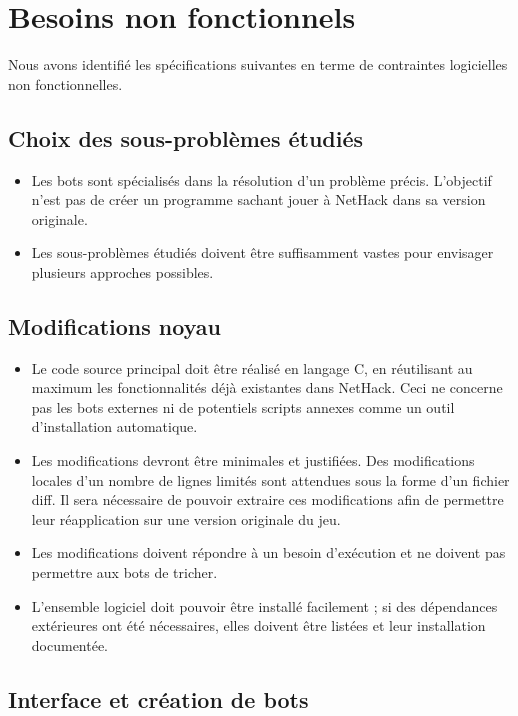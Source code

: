\documentclass[12pt]{article}
\begin{document}
\section{Besoins non fonctionnels}

Nous avons identifié les spécifications suivantes en terme de contraintes logicielles non fonctionnelles.

\subsection{Choix des sous-problèmes étudiés}

\begin{itemize}
	\item Les bots sont spécialisés dans la résolution d'un problème précis.  L'objectif n'est pas de créer un programme sachant jouer à NetHack dans sa version originale.
	\item Les sous-problèmes étudiés doivent être suffisamment vastes pour envisager plusieurs approches possibles.
\end{itemize}

\subsection{Modifications noyau}

\begin{itemize}
	\item Le code source principal doit être réalisé en langage C, en réutilisant au maximum les fonctionnalités déjà existantes dans NetHack. Ceci ne concerne pas les bots externes ni de potentiels scripts annexes comme un outil d'installation automatique.
	\item Les modifications devront être minimales et justifiées. Des modifications locales d'un nombre de lignes limités sont attendues sous la forme d'un fichier diff. Il sera nécessaire de pouvoir extraire ces modifications afin de permettre leur réapplication sur une version originale du jeu.  
	\item Les modifications doivent répondre à un besoin d'exécution et ne doivent pas permettre aux bots de tricher.
	\item L'ensemble logiciel doit pouvoir être installé facilement ; si des dépendances extérieures ont été nécessaires, elles doivent être listées et leur installation documentée.
\end{itemize}

\subsection{Interface et création de bots}
\end{document}
